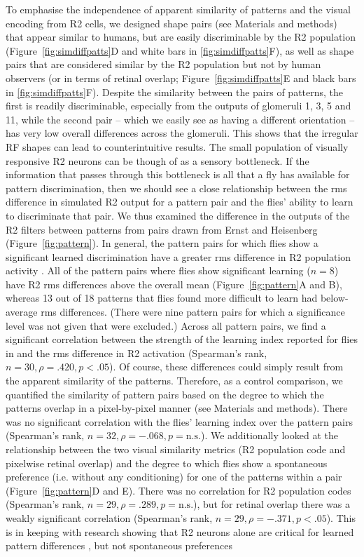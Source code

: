 To emphasise the independence of apparent similarity of patterns and the visual encoding from R2 cells, we designed shape pairs (see Materials and methods) that appear similar to humans, but are easily discriminable by the R2 population (Figure~\ref{fig:simdiffpatts}D and white bars in \ref{fig:simdiffpatts}F), as well as shape pairs that are considered similar by the R2 population but not by human observers (or in terms of retinal overlap; Figure~\ref{fig:simdiffpatts}E and black bars in \ref{fig:simdiffpatts}F). Despite the similarity between the pairs of patterns, the first is readily discriminable, especially from the outputs of glomeruli 1, 3, 5 and 11, while the second pair – which we easily see as having a different orientation – has very low overall differences across the glomeruli. This shows that the irregular RF shapes can lead to counterintuitive results. The small population of visually responsive R2 neurons can be though of as a sensory bottleneck. If the information that passes through this bottleneck is all that a fly has available for pattern discrimination, then we should see a close relationship between the \ac{rms} difference in simulated R2 output for a pattern pair and the flies’ ability to learn to discriminate that pair. We thus examined the difference in the outputs of the R2 filters between patterns from pairs drawn from Ernst and Heisenberg \cite{Ernst1999} (Figure~\ref{fig:pattern}). In general, the pattern pairs for which flies show a significant learned discrimination have a greater \ac{rms} difference in R2 population activity \cite{Ernst1999}. All of the pattern pairs where flies show significant learning ($n = 8$) have R2 \ac{rms} differences above the overall mean (Figure~\ref{fig:pattern}A and B), whereas 13 out of 18 patterns that flies found more difficult to learn had below-average \ac{rms} differences. (There were nine pattern pairs for which a significance level was not given that were excluded.) Across all pattern pairs, we find a significant correlation between the strength of the learning index reported for flies in \cite{Ernst1999} and the \ac{rms} difference in R2 activation (Spearman’s rank, $n = 30, \rho = .420, p < .05$). Of course, these differences could simply result from the apparent similarity of the patterns. Therefore, as a control comparison, we quantified the similarity of pattern pairs based on the degree to which the patterns overlap in a pixel-by-pixel manner (see Materials and methods). There was no significant correlation with the flies’ learning index over the pattern pairs (Spearman’s rank, $n = 32, \rho = -.068, p = \mathrm{n.s.}$). We additionally looked at the relationship between the two visual similarity metrics (R2 population code and pixelwise retinal overlap) and the degree to which flies show a spontaneous preference (i.e. without any conditioning) for one of the patterns within a pair (Figure~\ref{fig:pattern}D and E). There was no correlation for R2 population codes (Spearman's rank, $n = 29, \rho = .289, p = \mathrm{n.s.}$), but for retinal overlap there was a weakly significant correlation (Spearman's rank, $n = 29, \rho = -.371, p < .05$). This is in keeping with research showing that R2 neurons alone are critical for learned pattern differences \cite{Ernst1999}, but not spontaneous preferences 